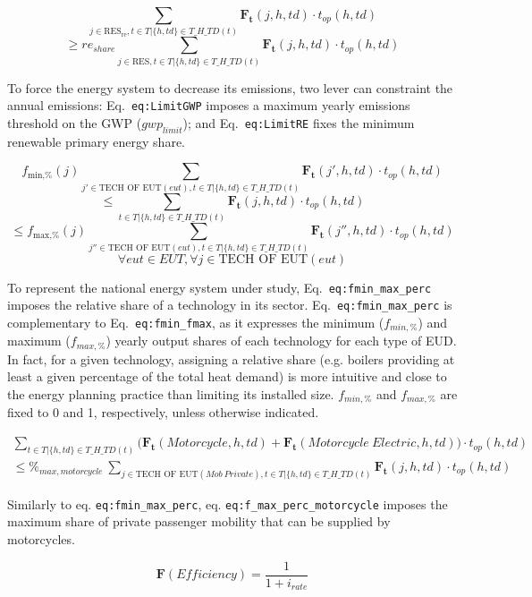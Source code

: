 \documentclass[
]{article}
\begin{document}
{\[\sum_{j \in  \text{RES}_\text{re},t \in T| \{h,td\} \in T\_H\_TD(t)} \textbf{F}_\textbf{t}(j,h,td)  \cdot  t_{op} (h,td)\]\[\geq 
re_{share} \sum_{j \in \text{RES} ,t \in T| \{h,td\} \in T\_H\_TD(t)} \textbf{F}_\textbf{t}(j,h,td) \cdot  t_{op} (h,td)\]}

To force the energy system to decrease its emissions, two lever can
constraint the annual emissions: Eq.~\texttt{eq:LimitGWP} imposes a
maximum yearly emissions threshold on the GWP (\(gwp_{limit}\)); and
Eq.~\texttt{eq:LimitRE} fixes the minimum renewable primary energy
share.

{\[f_{\text{min,\%}}(j) \sum_{j' \in \text{TECH OF EUT} (eut),t \in T|\{h,td\} \in T\_H\_TD(t)}    \textbf{F}_\textbf{t}(j',h,td)\cdot t_{op}(h,td)
\]\[\leq 
\sum_{t \in T|\{h,td\} \in T\_H\_TD(t)}  \textbf{F}_\textbf{t} (j,h,td)\cdot t_{op}(h,td)\]\[\leq 
f_{\text{max,\%}}(j) \sum_{j'' \in \text{TECH OF EUT} (eut),t \in T|\{h,td\} \in T\_H\_TD(t)}    \textbf{F}_\textbf{t}(j'',h,td)\cdot t_{op}(h,td)
\]\[\forall eut \in EUT, \forall j \in \text{TECH OF EUT} (eut)\]}

To represent the national energy system under study,
Eq.~\texttt{eq:fmin\_max\_perc} imposes the relative share of a
technology in its sector. Eq.~\texttt{eq:fmin\_max\_perc} is
complementary to Eq.~\texttt{eq:fmin\_fmax}, as it expresses the minimum
(\(f_{min,\%}\)) and maximum (\(f_{max,\%}\)) yearly output shares of
each technology for each type of EUD. In fact, for a given technology,
assigning a relative share (e.g. boilers providing at least a given
percentage of the total heat demand) is more intuitive and close to the
energy planning practice than limiting its installed size.
\(f_{min,\%}\) and \(f_{max,\%}\) are fixed to 0 and 1, respectively,
unless otherwise indicated.

{\[\begin{aligned}
\sum_{t \in T|\{h,td\} \in T\_H\_TD(t)} \big(\textbf{F}_\textbf{t}(Motorcycle,h,td)
+ \textbf{F}_\textbf{t}(Motorcycle~Electric,h,td)\big) \cdot t_{op}(h,td) \\
\leq \%_{max,motorcycle}~\sum_{j \in \text{TECH OF EUT} (Mob~Private), t \in T|\{h,td\} \in T\_H\_TD(t)} \textbf{F}_\textbf{t}(j,h,td)\cdot t_{op}(h,td)
\end{aligned}\]}

Similarly to eq. \texttt{eq:fmin\_max\_perc}, eq.
\texttt{eq:f\_max\_perc\_motorcycle} imposes the maximum share of
private passenger mobility that can be supplied by motorcycles.

{\[\textbf{F}(Efficiency) =  \frac{1}{1+i_{rate}}\]}
\end{document}
